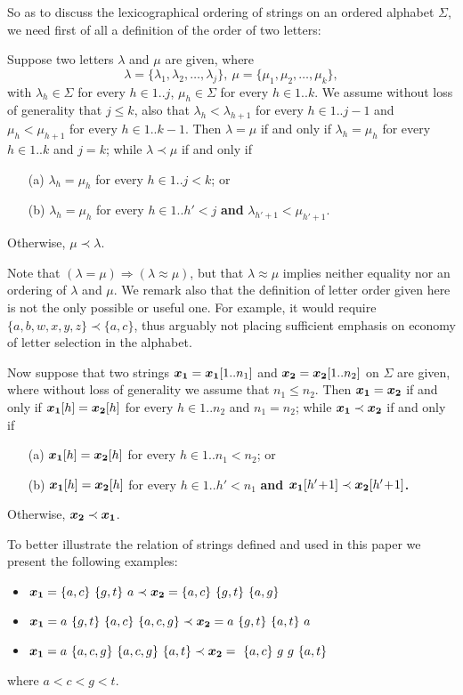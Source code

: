 \documentclass[runningheads,a4paper]{llncs}
\def\s#1{\mbox{\boldmath $#1$}}
\def\+{\!+\!}
\def\-{\!-\!}
\def\match{\approx}
\begin{document}
So as to discuss the lexicographical ordering of strings on an ordered alphabet $\Sigma$,
we need first of all a definition of the order of two letters:
\begin{definition}
\label{letterorder}
Suppose two letters $\lambda$ and $\mu$ are given, where
$$\lambda = \{\lambda_1, \lambda_2, \ldots, \lambda_j\},\
\mu = \{\mu_1, \mu_2, \ldots, \mu_k\},$$
with $\lambda_h \in \Sigma$ for every $h \in 1..j$,
$\mu_h \in \Sigma$ for every $h\in 1..k$.
We assume without loss of generality that $j \le k$,
also that $\lambda_h < \lambda_{h+1}$ for every $h \in 1..j\- 1$ and
$\mu_h < \mu_{h+1}$ for every $h \in 1..k\- 1$.
Then $\lambda = \mu$ if and only if
$\lambda_h = \mu_h$ for every $h \in 1..k$ and $j=k$; while
$\lambda \prec \mu$ if and only if
\begin{itemize}
\item[(a)]
$\lambda_h = \mu_h$ for every $h \in 1..j < k$; or
\item[(b)]
$\lambda_h = \mu_h$ for every $h \in 1..h' < j$ {\bf and}
$\lambda_{h'+1} < \mu_{h'+1}$.
\end{itemize}
Otherwise, $\mu \prec \lambda$.
\end{definition}
Note that $(\lambda = \mu) \Rightarrow (\lambda \match \mu)$,
but that $\lambda \match \mu$ implies neither equality nor an ordering
of $\lambda$ and $\mu$.
We remark also that the definition of letter order given here is
not the only possible or useful one.
For example, it would require
$\{a,b,w,x,y,z\} \prec \{a,c\}$, thus arguably not
placing sufficient emphasis on economy of letter selection in the alphabet.

\begin{definition}
\label{wordorder}
Now suppose that two strings $\s{x_1} = \s{x_1}[1..n_1]$
and $\s{x_2} = \s{x_2}[1..n_2]$ on $\Sigma$ are given,
where without loss of generality we assume that $n_1 \le n_2$.
Then $\s{x_1} = \s{x_2}$ if and only if $\s{x_1}[h] = \s{x_2}[h]$
for every $h \in 1..n_2$ and $n_1=n_2$; while
$\s{x_1} \prec \s{x_2}$ if and only if
\begin{itemize}
\item[(a)]
$\s{x_1}[h] = \s{x_2}[h]$ for every $h \in 1..n_1 < n_2$; or
\item[(b)]
$\s{x_1}[h] = \s{x_2}[h]$ for every $h \in 1..h' < n_1$ \bf{and}
$\s{x_1}[h'\+ 1] \prec \s{x_2}[h'\+ 1]$.
\end{itemize}
Otherwise, $\s{x_2} \prec \s{x_1}$.
\end{definition}

To better illustrate the relation of strings defined and used in this paper
we present the following examples:
\begin{itemize}
  \item $\s{x_1}=\{a,c\}~\{g,t\}~a  \prec \s{x_2} =\{a,c\}~\{g,t\}~\{a,g\}$
  \item $\s{x_1}=a~\{g,t\}~\{a,c\}~\{a,c,g\}  \prec \s{x_2} =a~\{g,t\}~\{a,t\}~a$
  \item $\s{x_1}=a~\{a,c,g\}~\{a,c,g\}~\{a,t\} \prec \s{x_2} =~\{a,c\}~g~g~\{a,t\}$
\end{itemize}
where $a < c < g < t$.
\end{document}
